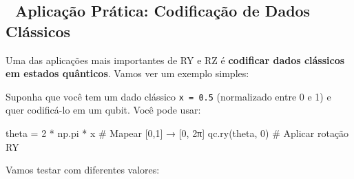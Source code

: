 \documentclass[
  brazilian,
]{report}
\newenvironment{Shaded}{\begin{snugshade}}{\end{snugshade}}
\newcommand{\CommentTok}[1]{\textcolor[rgb]{0.37,0.37,0.37}{#1}}
\newcommand{\DecValTok}[1]{\textcolor[rgb]{0.68,0.00,0.00}{#1}}
\newcommand{\NormalTok}[1]{\textcolor[rgb]{0.00,0.23,0.31}{#1}}
\newcommand{\OperatorTok}[1]{\textcolor[rgb]{0.37,0.37,0.37}{#1}}
\begin{document}
\subsection{🎯 Aplicação Prática: Codificação de Dados
Clássicos}\label{aplicauxe7uxe3o-pruxe1tica-codificauxe7uxe3o-de-dados-cluxe1ssicos}

Uma das aplicações mais importantes de RY e RZ é \textbf{codificar dados
clássicos em estados quânticos}. Vamos ver um exemplo simples:

Suponha que você tem um dado clássico \texttt{x\ =\ 0.5} (normalizado
entre 0 e 1) e quer codificá-lo em um qubit. Você pode usar:

\begin{Shaded}
\begin{Highlighting}[]
\NormalTok{theta }\OperatorTok{=} \DecValTok{2} \OperatorTok{*}\NormalTok{ np.pi }\OperatorTok{*}\NormalTok{ x  }\CommentTok{\# Mapear [0,1] → [0, 2π]}
\NormalTok{qc.ry(theta, }\DecValTok{0}\NormalTok{)        }\CommentTok{\# Aplicar rotação RY}
\end{Highlighting}
\end{Shaded}

Vamos testar com diferentes valores:
\end{document}
